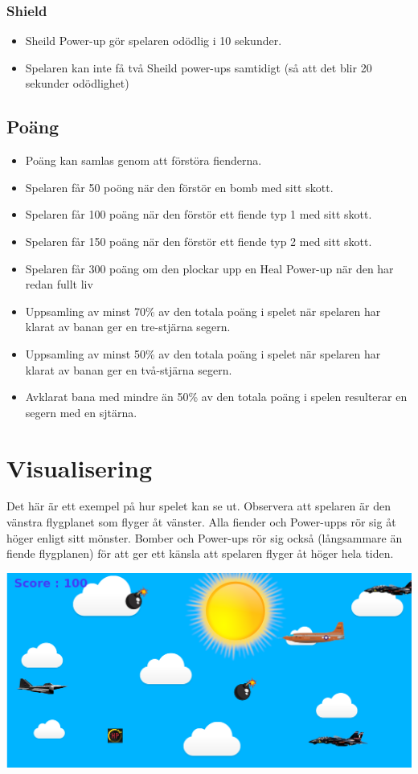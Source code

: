 \documentclass{TDP005mall}
\begin{document}
\subsubsection*{Shield}
\begin{itemize}
\item Sheild Power-up gör spelaren odödlig i 10 sekunder.
\item Spelaren kan inte få två Sheild power-ups samtidigt (så att det blir 20 sekunder odödlighet)
\end{itemize}


\subsection{Poäng}
\begin{itemize}
\item Poäng kan samlas genom att förstöra fienderna.
\item Spelaren får 50 poöng när den förstör en bomb med sitt skott.
\item Spelaren får 100 poäng när den förstör ett fiende typ 1 med sitt skott.
\item Spelaren får 150 poäng när den förstör ett fiende typ 2 med sitt skott.
\item Spelaren får 300 poäng om den plockar upp en Heal Power-up när den har redan fullt liv  
\item Uppsamling av minst 70\% av den totala poäng i spelet när spelaren har klarat av banan ger en tre-stjärna segern.
\item Uppsamling av minst 50\% av den totala poäng i spelet när spelaren har klarat av banan ger en två-stjärna segern.
\item Avklarat bana med mindre än 50\% av den totala poäng i spelen resulterar en segern med en sjtärna.

\end{itemize}

\section{Visualisering}
Det här är ett exempel på hur spelet kan se ut. Observera att spelaren är den vänstra flygplanet som flyger åt vänster. Alla fiender och Power-upps rör sig åt höger enligt sitt mönster. Bomber och Power-ups rör sig också (långsammare än fiende flygplanen) för att ger ett känsla att spelaren flyger åt höger hela tiden.


\includegraphics[scale=0.35]{Images/Game.png}
\end{document}
